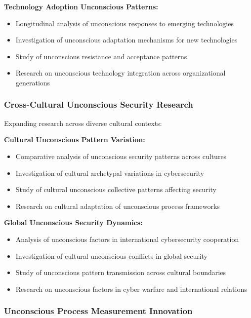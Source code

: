 \documentclass[11pt,a4paper]{article}
\begin{document}
\textbf{Technology Adoption Unconscious Patterns:}
\begin{itemize}
\item Longitudinal analysis of unconscious responses to emerging technologies
\item Investigation of unconscious adaptation mechanisms for new technologies
\item Study of unconscious resistance and acceptance patterns
\item Research on unconscious technology integration across organizational generations
\end{itemize}

\subsubsection{Cross-Cultural Unconscious Security Research}

Expanding research across diverse cultural contexts:

\textbf{Cultural Unconscious Pattern Variation:}
\begin{itemize}
\item Comparative analysis of unconscious security patterns across cultures
\item Investigation of cultural archetypal variations in cybersecurity
\item Study of cultural unconscious collective patterns affecting security
\item Research on cultural adaptation of unconscious process frameworks
\end{itemize}

\textbf{Global Unconscious Security Dynamics:}
\begin{itemize}
\item Analysis of unconscious factors in international cybersecurity cooperation
\item Investigation of cultural unconscious conflicts in global security
\item Study of unconscious pattern transmission across cultural boundaries
\item Research on unconscious factors in cyber warfare and international relations
\end{itemize}

\subsubsection{Unconscious Process Measurement Innovation}
\end{document}
